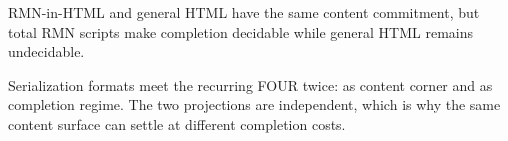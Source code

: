 \begin{theorem}\label{thm:rmn-html-decidable}\leanok{}
RMN-in-HTML and general HTML have the same content commitment, but total RMN
scripts make completion decidable while general HTML remains undecidable.
\end{theorem}

\begin{theorem}\label{thm:formats-closure-hierarchy}\leanok{}
Serialization formats meet the recurring FOUR twice: as content corner and as
completion regime.  The two projections are independent, which is why the same
content surface can settle at different completion costs.
\end{theorem}
